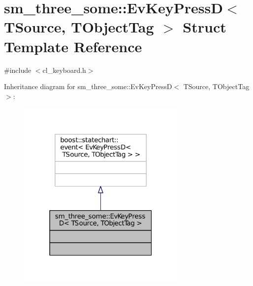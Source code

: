 \hypertarget{structsm__three__some_1_1EvKeyPressD}{}\section{sm\+\_\+three\+\_\+some\+:\+:Ev\+Key\+PressD$<$ T\+Source, T\+Object\+Tag $>$ Struct Template Reference}
\label{structsm__three__some_1_1EvKeyPressD}


{\ttfamily \#include $<$cl\+\_\+keyboard.\+h$>$}



Inheritance diagram for sm\+\_\+three\+\_\+some\+:\+:Ev\+Key\+PressD$<$ T\+Source, T\+Object\+Tag $>$\+:
\nopagebreak
\begin{figure}[H]
\begin{center}
\leavevmode
\includegraphics[width=235pt]{structsm__three__some_1_1EvKeyPressD__inherit__graph}
\end{center}
\end{figure}


